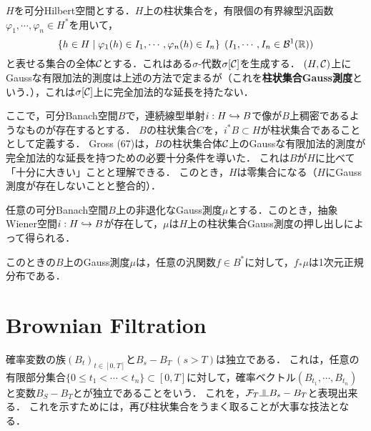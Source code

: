 \documentclass[uplatex,dvipdfmx]{jsreport}
\begin{document}
\begin{discussion}
    $H$を可分Hilbert空間とする．$H$上の柱状集合を，有限個の有界線型汎函数$\varphi_1,\cdots,\varphi_n\in H^*$を用いて，
    \[\left\{h\in H\mid\varphi_1(h)\in I_1,\cdots,\varphi_n(h)\in I_n\right\}\;(I_1,\cdots,I_n\in\mathcal{B}^1(\mathbb{R}))\]
    と表せる集合の全体$\mathcal{C}$とする．これはある$\sigma$-代数$\sigma[\mathcal{C}]$を生成する．
    $(H,\mathcal{C})$上にGaussな有限加法的測度は上述の方法で定まるが（これを\textbf{柱状集合Gauss測度}という．），これは$\sigma[\mathcal{C}]$上に完全加法的な延長を持たない．

    ここで，可分Banach空間$B$で，連続線型単射$i:H\hookrightarrow B$で像が$B$上稠密であるようなものが存在するとする．
    $B$の柱状集合$C$を，$i^*B\subset H$が柱状集合であることとして定義する．
    Gross (67)は，$B$の柱状集合体$\mathcal{C}$上のGaussな有限加法的測度が完全加法的な延長を持つための必要十分条件を導いた．
    これは$B$が$H$に比べて「十分に大きい」ことと理解できる．
    このとき，$H$は零集合になる（$H$にGauss測度が存在しないことと整合的）．
\end{discussion}

\begin{theorem}\label{thm-Structure-theorem-for-Gaussian-measures}
    任意の可分Banach空間$B$上の非退化なGauss測度$\mu$とする．このとき，抽象Wiener空間$i:H\hookrightarrow B$が存在して，$\mu$は$H$上の柱状集合Gauss測度の押し出しによって得られる．
\end{theorem}
\begin{remarks}
    このときの$B$上のGauss測度$\mu$は，任意の汎関数$f\in B^*$に対して，$f_*\mu$は1次元正規分布である．
\end{remarks}

\section{Brownian Filtration}

\begin{tcolorbox}[colframe=ForestGreen, colback=ForestGreen!10!white,breakable,colbacktitle=ForestGreen!40!white,coltitle=black,fonttitle=\bfseries\sffamily,
title=]
    確率変数の族$(B_t)_{t\in[0,T]}$と$B_s-B_T\;(s>T)$は独立である．
    これは，任意の有限部分集合$\{0\le t_1<\cdots<t_n\}\subset[0,T]$に対して，確率ベクトル$(B_{t_1},\cdots,B_{t_n})$と変数$B_S-B_T$とが独立であることをいう．
    これを，$\F_T\indep B_s-B_T$と表現出来る．
    これを示すためには，再び柱状集合をうまく取ることが大事な技法となる．
\end{tcolorbox}
\end{document}
